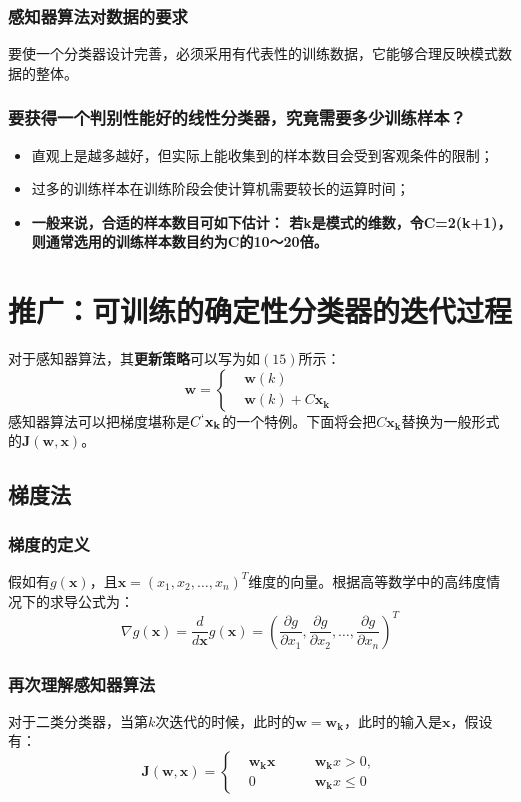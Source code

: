 \documentclass[12pt, letterpaper]{article}
\begin{document}
\subsubsection*{感知器算法对数据的要求}
要使一个分类器设计完善，必须采用有代表性的训练数据，它能够合理反映模式数据的整体。
\subsubsection*{要获得一个判别性能好的\textbf{线性分类器}，究竟需要多少训练样本？
}
\begin{itemize}
\item 直观上是越多越好，但实际上能收集到的样本数目会受到客观条件的限制；

\item 过多的训练样本在训练阶段会使计算机需要较长的运算时间；


\item \textbf{一般来说，合适的样本数目可如下估计：
	若k是模式的维数，令C=2(k+1)，则通常选用的训练样本数目约为C的10～20倍。
}
\end{itemize}



\section{推广：可训练的确定性分类器的迭代过程}
对于感知器算法，其\textbf{更新策略}可以写为如$(15)$所示：
$$
\mathbf{w}=\left\{
\begin{aligned}
& \mathbf{w}(k) \\
& \mathbf{w}(k)+C\mathbf{x_k}
\end{aligned}
\right.
$$
感知器算法可以把梯度堪称是$C^{`}\mathbf{x_k}$的一个特例。下面将会把$C\mathbf{x_k}$替换为一般形式的$\mathbf{J}(\mathbf{w}, \mathbf{x})$。


\subsection{梯度法}
\subsubsection*{梯度的定义}
假如有$g(\mathbf{x})$，且$\mathbf{x}=(x_1,x_2,\ldots,x_n)^T$维度的向量。根据高等数学中的高纬度情况下的求导公式为：
$$
\nabla g(\mathbf{x})=\frac{d}{d\mathbf{x}}g(\mathbf{x})=(\frac{\partial g}{\partial x_1},\frac{\partial g}{\partial x_2},\ldots,\frac{\partial g}{\partial x_n})^T
$$

\subsubsection*{再次理解感知器算法}
对于二类分类器，当第$k$次迭代的时候，此时的$\mathbf{w}=\mathbf{w_k}$，此时的输入是$\mathbf{x}$，假设有：
$$
\mathbf{J}(\mathbf{w},\mathbf{x})=
\left\{
\begin{aligned}
&\mathbf{w_k}\mathbf{x}\qquad &\mathbf{w_k}x>0,\\
&0 \qquad &\mathbf{w_k}x\leq 0
\end{aligned}
\right .
$$
\end{document}
